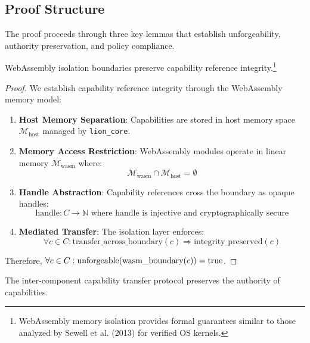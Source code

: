\subsection{Proof Structure}

The proof proceeds through three key lemmas that establish unforgeability, authority preservation, and policy compliance.

\begin{lemma}
WebAssembly isolation boundaries preserve capability reference integrity.\footnote{WebAssembly memory isolation provides formal guarantees similar to those analyzed by Sewell et al. (2013) for verified OS kernels.}
\end{lemma}

\begin{proof}
We establish capability reference integrity through the WebAssembly memory model:

\begin{enumerate}
\item \textbf{Host Memory Separation}: Capabilities are stored in host memory space $\mathcal{M}_{\text{host}}$ managed by \texttt{lion\_core}.
\item \textbf{Memory Access Restriction}: WebAssembly modules operate in linear memory $\mathcal{M}_{\text{wasm}}$ where:
\begin{equation}
\mathcal{M}_{\text{wasm}} \cap \mathcal{M}_{\text{host}} = \emptyset
\end{equation}
\item \textbf{Handle Abstraction}: Capability references cross the boundary as opaque handles:
\begin{equation}
\text{handle}: C \to \mathbb{N} \text{ where } \text{handle} \text{ is injective and cryptographically secure}
\end{equation}
\item \textbf{Mediated Transfer}: The isolation layer enforces:
\begin{equation}
\forall c \in C: \text{transfer\_across\_boundary}(c) \Rightarrow \text{integrity\_preserved}(c)
\end{equation}
\end{enumerate}

Therefore, $\forall c \in C: \text{unforgeable}(\text{wasm\_boundary}(c)) = \text{true}$.
\end{proof}

\begin{lemma}
The inter-component capability transfer protocol preserves the authority of capabilities.
\end{lemma}

